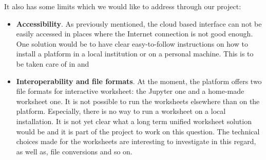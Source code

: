 \documentclass{deliverablereport}
\begin{document}
It also has some limits which we would like to address through our
project:
\begin{itemize}
\item \textbf{Accessibility}. As previously mentioned, the cloud based
  interface can not be easily accessed in places where the Internet
  connection is not good enough. One solution would be to have clear
  easy-to-follow instructions on how to install a \SMC platform in a
  local institution or on a personal machine. This is to be taken care of in
  and 

\item \textbf{Interoperability and file formats}. At the moment, the
  \SMC platform offers two file formats for interactive worksheet: the
  Jupyter one and a home-made \Sage worksheet one. It is not possible
  to run the \Sage worksheets elsewhere than on the
  platform. Especially, there is no way to run a \Sage worksheet on a
  local \Sage installation. It is not yet clear what a long term
  unified worksheet solution would be and it is part of the \ODK
  project to work on this question. The technical choices made for the
  \Sage worksheets are interesting to investigate in this regard, as
  well as, file conversions and so on.
\end{itemize}
\end{document}

